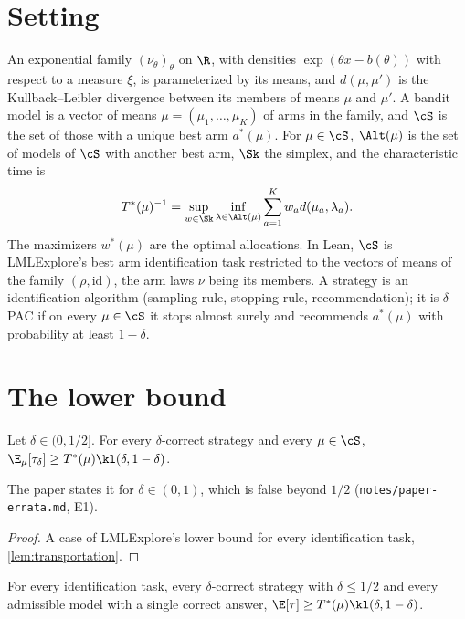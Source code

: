 \chapter{Setting}
\label{chap:setting}

An exponential family $(\nu_\theta)_\theta$ on $\R$, with densities $\exp(\theta x - b(\theta))$
with respect to a measure $\xi$, is parameterized by its means, and $d(\mu, \mu')$ is the
Kullback--Leibler divergence between its members of means $\mu$ and $\mu'$. A bandit model is a
vector of means $\mu = (\mu_1, \dots, \mu_K)$ of arms in the family, and $\cS$ is the set of those
with a unique best arm $a^*(\mu)$. For $\mu \in \cS$, $\Alt(\mu)$ is the set of models of $\cS$
with another best arm, $\Sk$ the simplex, and the characteristic time is
\[ T^*(\mu)^{-1} = \sup_{w \in \Sk} \inf_{\lambda \in \Alt(\mu)} \sum_{a=1}^K w_a d(\mu_a, \lambda_a). \]
The maximizers $w^*(\mu)$ are the optimal allocations. In Lean, $\cS$ is LMLExplore's best arm
identification task restricted to the vectors of means of the family $(\rho, \mathrm{id})$, the
arm laws $\nu$ being its members. A strategy is an identification algorithm (sampling rule,
stopping rule, recommendation); it is $\delta$-PAC if on every $\mu \in \cS$ it stops almost surely
and recommends $a^*(\mu)$ with probability at least $1 - \delta$.

\chapter{The lower bound}
\label{chap:lower}

\begin{theorem}[{\cite[Theorem 1]{GK16}}]
  \label{thm:lower}
  \leanok
  Let $\delta \in (0, 1/2]$. For every $\delta$-correct strategy and every $\mu \in \cS$,
  $\E_\mu[\tau_\delta] \ge T^*(\mu) \kl(\delta, 1 - \delta)$.
\end{theorem}

The paper states it for $\delta \in (0, 1)$, which is false beyond $1/2$
(\texttt{notes/paper-errata.md}, E1).

\begin{proof}
  \leanok
  A case of LMLExplore's lower bound for every identification task, \cref{lem:transportation}.
\end{proof}

\begin{lemma}
  \label{lem:transportation}
  \leanok
  For every identification task, every $\delta$-correct strategy with $\delta \le 1/2$ and every
  admissible model with a single correct answer,
  $\E[\tau] \ge T^*(\mu) \kl(\delta, 1 - \delta)$.
\end{lemma}

